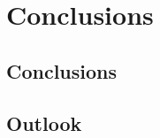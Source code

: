 \hypertarget{conclusion}{%
\chapter{Conclusions}\label{conclusion}}


\hypertarget{conclusion-text}{%
\section{Conclusions}\label{conclusion-text}}


\hypertarget{outlook}{%
\section{Outlook}\label{outlook}}